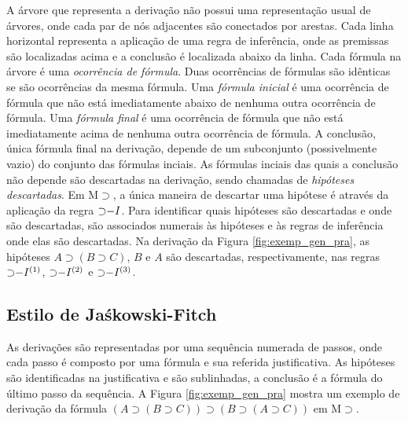 A árvore que representa a derivação não possui uma representação usual de árvores, onde cada par de nós adjacentes são conectados por arestas. Cada linha horizontal representa a aplicação de uma regra de inferência, onde as premissas são localizadas acima e a conclusão é localizada abaixo da linha. Cada fórmula na árvore é uma \textit{ocorrência de fórmula}. Duas ocorrências de fórmulas são idênticas se são ocorrências da mesma fórmula. Uma \textit{fórmula inicial} é uma ocorrência de fórmula que não está imediatamente abaixo de nenhuma outra ocorrência de fórmula. Uma \textit{fórmula final} é uma ocorrência de fórmula que não está imediatamente acima de nenhuma outra ocorrência de fórmula. A conclusão, única fórmula final na derivação, depende de um subconjunto (possivelmente vazio) do conjunto das fórmulas inciais. As fórmulas inciais das quais a conclusão não depende são descartadas na derivação, sendo chamadas de \textit{hipóteses descartadas}. Em M$\supset$, a única maneira de descartar uma hipótese é através da aplicação da regra $\mathord{\supset}{-I}$. Para identificar quais hipóteses são descartadas e onde são descartadas, são associados numerais às hipóteses e às regras de inferência onde elas são descartadas. Na derivação da Figura \ref{fig:exemp_gen_pra}, as hipóteses $A \supset (B \supset C)$, $B$ e $A$ são descartadas, respectivamente, nas regras $\mathord{\supset}{-I^{(1)}}$, $\mathord{\supset}{-I^{(2)}}$ e $\mathord{\supset}{-I^{(3)}}$.

\subsection{Estilo de Ja{\'s}kowski-Fitch}
\label{sec:est_jas_fit}

As derivações são representadas por uma sequência numerada de passos, onde cada passo é composto por uma fórmula e sua referida justificativa. As hipóteses são identificadas na justificativa e são sublinhadas, a conclusão é a fórmula do último passo da sequência. A Figura \ref{fig:exemp_gen_pra} mostra um exemplo de derivação da fórmula $(A \supset (B \supset C)) \supset (B \supset (A \supset C))$ em M$\supset$.

